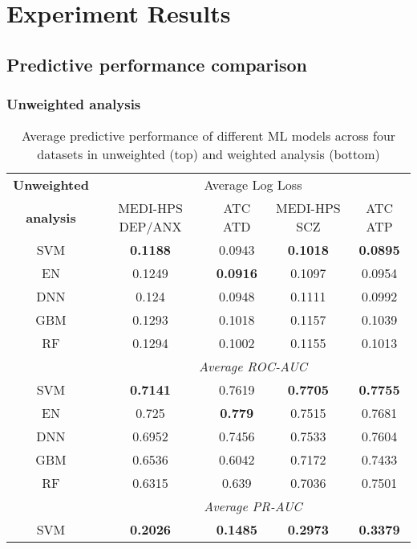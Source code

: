 \section{Experiment Results}
  \subsection{Predictive performance comparison}
    \subsubsection{Unweighted analysis }

      \begin{table}[htbp]
        \centering
        \begin{threeparttable}
        \caption{Average predictive performance of different ML models across four datasets in unweighted (top) and weighted analysis (bottom)}
          \begin{tabular}{c|cccc}
          \toprule
          \textbf{Unweighted} & \multicolumn{4}{c}{Average Log Loss} \\
          \textbf{ analysis} & MEDI-HPS DEP/ANX & ATC ATD  & MEDI-HPS SCZ  & ATC ATP  \\
          \midrule
          SVM   & \textbf{0.1188} & 0.0943 & \textbf{0.1018} & \textbf{0.0895} \\
          EN    & 0.1249 & \textbf{0.0916} & 0.1097 & 0.0954 \\
          DNN   & 0.124 & 0.0948 & 0.1111 & 0.0992 \\
          GBM   & 0.1293 & 0.1018 & 0.1157 & 0.1039 \\
          RF    & 0.1294 & 0.1002 & 0.1155 & 0.1013 \\
                & \multicolumn{4}{c}{\textit{Average ROC-AUC}} \\
          SVM   & \textbf{0.7141} & 0.7619 & \textbf{0.7705} & \textbf{0.7755} \\
          EN    & 0.725 & \textbf{0.779} & 0.7515 & 0.7681 \\
          DNN   & 0.6952 & 0.7456 & 0.7533 & 0.7604 \\
          GBM   & 0.6536 & 0.6042 & 0.7172 & 0.7433 \\
          RF    & 0.6315 & 0.639 & 0.7036 & 0.7501 \\
                & \multicolumn{4}{c}{\textit{Average PR-AUC}} \\
          SVM   & \textbf{0.2026} & \textbf{0.1485} & \textbf{0.2973} & \textbf{0.3379} \\

\end{tabular}
\end{threeparttable}
\end{table}
